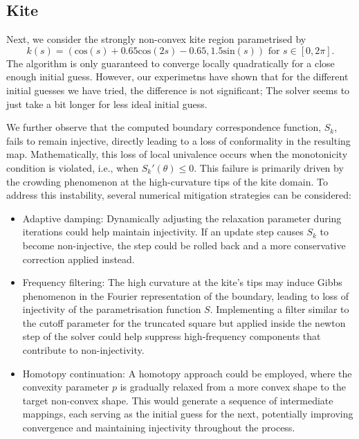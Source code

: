 \subsection{Kite}
Next, we consider the strongly non-convex kite region parametrised by     
\begin{equation}
    k(s) = (\text{cos}(s) + 0.65\text{cos}(2s) - 0.65, 1.5 \text{sin}(s)) \text{ for }s \in [0,2\pi].
\end{equation}
The algorithm is only guaranteed to converge locally quadratically for a close enough initial guess. 
However, our experimetns have shown that for the different initial guesses we have tried, the difference is not significant; The solver seems to just take a bit longer for less ideal initial guess.

\bigskip

We further observe that the computed boundary correspondence function, $S_k$, fails to remain injective, directly leading to a loss of conformality in the resulting map. Mathematically, this loss of local univalence occurs when the monotonicity condition is violated, i.e., when $S_k'(\theta) \le 0$. This failure is primarily driven by the crowding phenomenon at the high-curvature tips of the kite domain. To address this instability, several numerical mitigation strategies can be considered:
\begin{itemize}
    \item Adaptive damping: Dynamically adjusting the relaxation parameter during iterations could help maintain injectivity. If an update step causes $S_k$ to become non-injective, the step could be rolled back and a more conservative correction applied instead.
    \item Frequency filtering: The high curvature at the kite's tips may induce Gibbs phenomenon in the Fourier representation of the boundary, leading to loss of injectivity of the parametrisation function $S$. Implementing a filter similar to the cutoff parameter for the truncated square but applied inside the newton step of the solver could help suppress high-frequency components that contribute to non-injectivity.
    \item Homotopy continuation: A homotopy approach could be employed, where the convexity parameter $p$ is gradually relaxed from a more convex shape to the target non-convex shape. This would generate a sequence of intermediate mappings, each serving as the initial guess for the next, potentially improving convergence and maintaining injectivity throughout the process.
\end{itemize}

